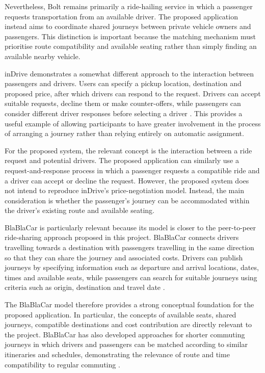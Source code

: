 Nevertheless, Bolt remains primarily a ride-hailing service in which a passenger requests transportation from an available driver. The proposed application instead aims to coordinate shared journeys between private vehicle owners and passengers. This distinction is important because the matching mechanism must prioritise route compatibility and available seating rather than simply finding an available nearby vehicle.

inDrive demonstrates a somewhat different approach to the interaction between passengers and drivers. Users can specify a pickup location, destination and proposed price, after which drivers can respond to the request. Drivers can accept suitable requests, decline them or make counter-offers, while passengers can consider different driver responses before selecting a driver \citep{indrive}. This provides a useful example of allowing participants to have greater involvement in the process of arranging a journey rather than relying entirely on automatic assignment.

For the proposed system, the relevant concept is the interaction between a ride request and potential drivers. The proposed application can similarly use a request-and-response process in which a passenger requests a compatible ride and a driver can accept or decline the request. However, the proposed system does not intend to reproduce inDrive's price-negotiation model. Instead, the main consideration is whether the passenger's journey can be accommodated within the driver's existing route and available seating.

BlaBlaCar is particularly relevant because its model is closer to the peer-to-peer ride-sharing approach proposed in this project. BlaBlaCar connects drivers travelling towards a destination with passengers travelling in the same direction so that they can share the journey and associated costs. Drivers can publish journeys by specifying information such as departure and arrival locations, dates, times and available seats, while passengers can search for suitable journeys using criteria such as origin, destination and travel date \citep{blablacar}.

The BlaBlaCar model therefore provides a strong conceptual foundation for the proposed application. In particular, the concepts of available seats, shared journeys, compatible destinations and cost contribution are directly relevant to the project. BlaBlaCar has also developed approaches for shorter commuting journeys in which drivers and passengers can be matched according to similar itineraries and schedules, demonstrating the relevance of route and time compatibility to regular commuting \citep{blablacar}.

